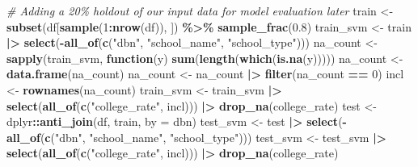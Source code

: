 \documentclass[
  man,floatsintext]{apa6}
\newenvironment{Shaded}{\begin{snugshade}}{\end{snugshade}}
\newcommand{\AttributeTok}[1]{\textcolor[rgb]{0.13,0.29,0.53}{#1}}
\newcommand{\CommentTok}[1]{\textcolor[rgb]{0.56,0.35,0.01}{\textit{#1}}}
\newcommand{\ControlFlowTok}[1]{\textcolor[rgb]{0.13,0.29,0.53}{\textbf{#1}}}
\newcommand{\DecValTok}[1]{\textcolor[rgb]{0.00,0.00,0.81}{#1}}
\newcommand{\FloatTok}[1]{\textcolor[rgb]{0.00,0.00,0.81}{#1}}
\newcommand{\FunctionTok}[1]{\textcolor[rgb]{0.13,0.29,0.53}{\textbf{#1}}}
\newcommand{\NormalTok}[1]{#1}
\newcommand{\OtherTok}[1]{\textcolor[rgb]{0.56,0.35,0.01}{#1}}
\newcommand{\SpecialCharTok}[1]{\textcolor[rgb]{0.81,0.36,0.00}{\textbf{#1}}}
\newcommand{\StringTok}[1]{\textcolor[rgb]{0.31,0.60,0.02}{#1}}
\begin{document}
\begin{Shaded}
\begin{Highlighting}[]
\CommentTok{\# Adding a 20\% holdout of our input data for model evaluation later}
\NormalTok{train }\OtherTok{\textless{}{-}} \FunctionTok{subset}\NormalTok{(df[}\FunctionTok{sample}\NormalTok{(}\DecValTok{1}\SpecialCharTok{:}\FunctionTok{nrow}\NormalTok{(df)), ]) }\SpecialCharTok{\%\textgreater{}\%} \FunctionTok{sample\_frac}\NormalTok{(}\FloatTok{0.8}\NormalTok{)}
\NormalTok{train\_svm }\OtherTok{\textless{}{-}}\NormalTok{ train }\SpecialCharTok{|\textgreater{}} \FunctionTok{select}\NormalTok{(}\SpecialCharTok{{-}}\FunctionTok{all\_of}\NormalTok{(}\FunctionTok{c}\NormalTok{(}\StringTok{"dbn"}\NormalTok{, }\StringTok{"school\_name"}\NormalTok{, }\StringTok{"school\_type"}\NormalTok{)))}
\NormalTok{na\_count }\OtherTok{\textless{}{-}}\FunctionTok{sapply}\NormalTok{(train\_svm, }\ControlFlowTok{function}\NormalTok{(y) }\FunctionTok{sum}\NormalTok{(}\FunctionTok{length}\NormalTok{(}\FunctionTok{which}\NormalTok{(}\FunctionTok{is.na}\NormalTok{(y)))))}
\NormalTok{na\_count }\OtherTok{\textless{}{-}} \FunctionTok{data.frame}\NormalTok{(na\_count)}
\NormalTok{na\_count }\OtherTok{\textless{}{-}}\NormalTok{ na\_count }\SpecialCharTok{|\textgreater{}}
    \FunctionTok{filter}\NormalTok{(na\_count }\SpecialCharTok{==} \DecValTok{0}\NormalTok{)}
\NormalTok{incl }\OtherTok{\textless{}{-}} \FunctionTok{rownames}\NormalTok{(na\_count)}
\NormalTok{train\_svm }\OtherTok{\textless{}{-}}\NormalTok{ train\_svm }\SpecialCharTok{|\textgreater{}}
    \FunctionTok{select}\NormalTok{(}\FunctionTok{all\_of}\NormalTok{(}\FunctionTok{c}\NormalTok{(}\StringTok{"college\_rate"}\NormalTok{, incl))) }\SpecialCharTok{|\textgreater{}}
    \FunctionTok{drop\_na}\NormalTok{(college\_rate)}
\NormalTok{test  }\OtherTok{\textless{}{-}}\NormalTok{ dplyr}\SpecialCharTok{::}\FunctionTok{anti\_join}\NormalTok{(df, train, }\AttributeTok{by =} \StringTok{\textquotesingle{}dbn\textquotesingle{}}\NormalTok{)}
\NormalTok{test\_svm }\OtherTok{\textless{}{-}}\NormalTok{ test }\SpecialCharTok{|\textgreater{}} \FunctionTok{select}\NormalTok{(}\SpecialCharTok{{-}}\FunctionTok{all\_of}\NormalTok{(}\FunctionTok{c}\NormalTok{(}\StringTok{"dbn"}\NormalTok{, }\StringTok{"school\_name"}\NormalTok{, }\StringTok{"school\_type"}\NormalTok{)))}
\NormalTok{test\_svm }\OtherTok{\textless{}{-}}\NormalTok{ test\_svm }\SpecialCharTok{|\textgreater{}}
    \FunctionTok{select}\NormalTok{(}\FunctionTok{all\_of}\NormalTok{(}\FunctionTok{c}\NormalTok{(}\StringTok{"college\_rate"}\NormalTok{, incl))) }\SpecialCharTok{|\textgreater{}}
    \FunctionTok{drop\_na}\NormalTok{(college\_rate)}


\end{Highlighting}
\end{Shaded}
\end{document}
